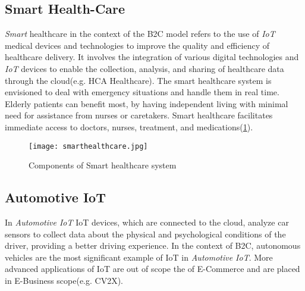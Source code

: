 \documentclass[10pt,journal,compsoc]{IEEEtran}
\begin{document}
	\subsection{Smart Health-Care}
	\emph{Smart} healthcare in the context of the B2C model refers to the use of \emph{IoT} medical devices and technologies to improve the quality and efficiency of healthcare delivery. It involves the integration of various digital technologies and \emph{IoT} devices to enable the collection, analysis, and sharing of healthcare data through the cloud(e.g. HCA Healthcare). The smart healthcare system is envisioned to deal with emergency situations and handle them in real time\cite{ISRAVEL202061}. Elderly patients can benefit most, by having independent living with minimal need for assistance from nurses or caretakers.
	Smart healthcare facilitates immediate access to doctors, nurses, treatment, and medications(\cref{smarthealth}).
	\begin{figure}[h]
		\texttt{[image: smarthealthcare.jpg]}
		\caption{Components of Smart healthcare system}
		\label{smarthealth}
	\end{figure}
	\subsection{Automotive IoT}
	In \emph{Automotive IoT} IoT devices, which are connected to the cloud, analyze car sensors to collect data about the physical and psychological conditions of the driver, providing a better driving experience. In the context of B2C, autonomous vehicles are the most significant example of IoT in \emph{Automotive IoT}. More advanced applications of IoT are out of scope the of E-Commerce and are placed in E-Business scope(e.g. CV2X).



\end{document}
